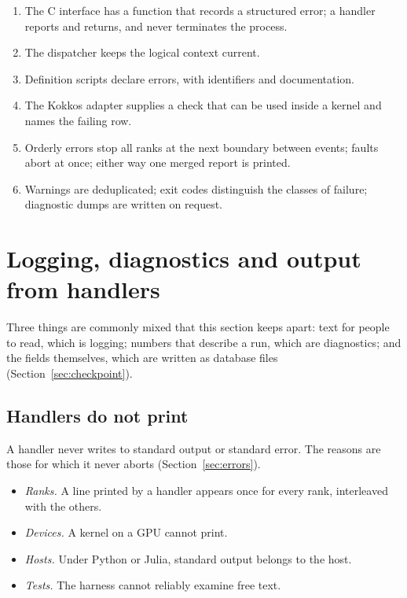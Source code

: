 \documentclass[11pt,a4paper]{article}
\begin{document}
\begin{enumerate}
  \item The C interface has a function that records a structured error; a
        handler reports and returns, and never terminates the process.
  \item The dispatcher keeps the logical context current.
  \item Definition scripts declare errors, with identifiers and
        documentation.
  \item The Kokkos adapter supplies a check that can be used inside a
        kernel and names the failing row.
  \item Orderly errors stop all ranks at the next boundary between events;
        faults abort at once; either way one merged report is printed.
  \item Warnings are deduplicated; exit codes distinguish the classes of
        failure; diagnostic dumps are written on request.
\end{enumerate}

\section{Logging, diagnostics and output from handlers}
\label{sec:logging}

Three things are commonly mixed that this section keeps apart: text for
people to read, which is logging; numbers that describe a run, which are
diagnostics; and the fields themselves, which are written as database files
(Section~\ref{sec:checkpoint}).

\subsection{Handlers do not print}

A handler never writes to standard output or standard error.  The reasons
are those for which it never aborts (Section~\ref{sec:errors}).

\begin{itemize}
  \item \emph{Ranks.}  A line printed by a handler appears once for every
        rank, interleaved with the others.
  \item \emph{Devices.}  A kernel on a GPU cannot print.
  \item \emph{Hosts.}  Under Python or Julia, standard output belongs to the
        host.
  \item \emph{Tests.}  The harness cannot reliably examine free text.
\end{itemize}
\end{document}
